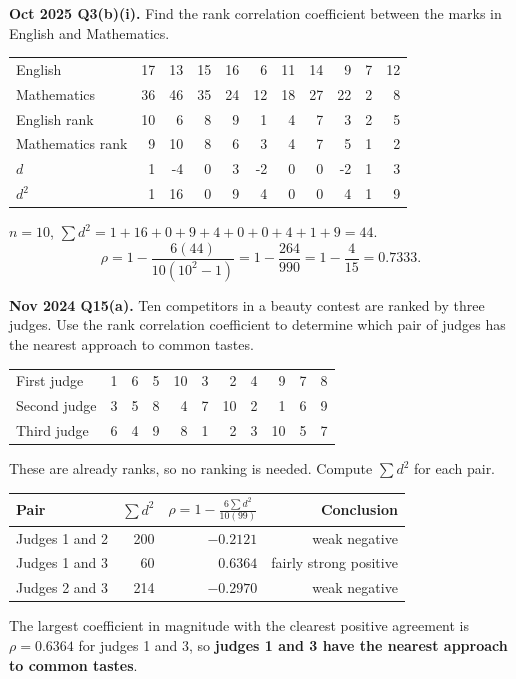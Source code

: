 \documentclass[11pt,a4paper]{article}
\begin{document}
\begin{pyqbox}
\textbf{Oct 2025 Q3(b)(i).} Find the rank correlation coefficient between the marks in English and Mathematics.

\begin{center}\small
\begin{tabular}{l|rrrrrrrrrr}
\toprule English & 17&13&15&16&6&11&14&9&7&12\\
Mathematics & 36&46&35&24&12&18&27&22&2&8\\\midrule
English rank & 10&6&8&9&1&4&7&3&2&5\\
Mathematics rank & 9&10&8&6&3&4&7&5&1&2\\
$d$ & 1&-4&0&3&-2&0&0&-2&1&3\\
$d^2$ & 1&16&0&9&4&0&0&4&1&9\\\bottomrule
\end{tabular}
\end{center}
\end{pyqbox}

\begin{solbox}
$n=10$, $\sum d^2=1+16+0+9+4+0+0+4+1+9=44$.
\[
\rho=1-\frac{6(44)}{10(10^2-1)}=1-\frac{264}{990}=1-\frac{4}{15}=\boxed{0.7333}.
\]
\end{solbox}

\begin{pyqbox}
\textbf{Nov 2024 Q15(a).} Ten competitors in a beauty contest are ranked by three judges. Use the rank correlation coefficient to determine which pair of judges has the nearest approach to common tastes.

\begin{center}\small
\begin{tabular}{l|rrrrrrrrrr}
\toprule First judge & 1&6&5&10&3&2&4&9&7&8\\
Second judge & 3&5&8&4&7&10&2&1&6&9\\
Third judge & 6&4&9&8&1&2&3&10&5&7\\\bottomrule
\end{tabular}
\end{center}
\end{pyqbox}

\begin{solbox}
These are already ranks, so no ranking is needed. Compute $\sum d^2$ for each pair.

\begin{center}\small
\begin{tabular}{l|r|r|r}
\toprule Pair & $\sum d^2$ & $\rho=1-\frac{6\sum d^2}{10(99)}$ & Conclusion\\\midrule
Judges 1 and 2 & 200 & $-0.2121$ & weak negative\\
Judges 1 and 3 & 60 & $0.6364$ & fairly strong positive\\
Judges 2 and 3 & 214 & $-0.2970$ & weak negative\\\bottomrule
\end{tabular}
\end{center}

The largest coefficient in magnitude with the clearest positive agreement is $\rho=0.6364$ for judges 1 and 3, so \textbf{judges 1 and 3 have the nearest approach to common tastes}.
\end{solbox}
\end{document}
